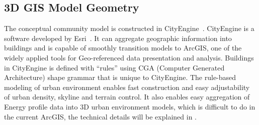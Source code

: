 \begin{comment}
\begin{figure}[h!]
  \centering
  \begin{subfigure}{0.4\textwidth}
  \centering
  \texttt{[image: original-Cooling:Electricity]}
  \caption[Electricity Cooling Demand]{Electricity Cooling Demand}
  \label{fig:original-Cooling:Electricity}
\end{subfigure}
~
\begin{subfigure}{0.4\textwidth}
  \centering
  \texttt{[image: log-Scale-Cooling:Electricity]}
  \caption[Electricity Cooling Demand]{Electricity Cooling Demand in Log Scale}
  \label{fig:log-Scale-Cooling:Electricity}
\end{subfigure}
  \caption[Electricity Cooling Demand Log]{Electricity Cooling Demand in Log Scale}
\end{figure}

\pagebreak
\item Electricity
\begin{figure}[h!]
  \centering
  \begin{subfigure}{0.4\textwidth}
  \centering
  \texttt{[image: original-Electricity:Facility]}
  \caption[Electricity  Demand]{Electricity Demand}
  \label{fig:original-Electricity:Facility}
\end{subfigure}
~
\begin{subfigure}{0.4\textwidth}
  \centering
  \texttt{[image: log-Scale-Electricity:Facility]}
  \caption[Electricity  Demand]{Electricity  Demand in Log Scale}
  \label{fig:log-Scale-Electricity:Facility}
\end{subfigure}
  \caption[Electricity  Demand Log]{Electricity Demand in Log Scale}
\end{figure}

\end{itemize}
\end{comment}

\pagebreak
\subsection{3D GIS Model Geometry}
The conceptual community model is constructed in
CityEngine~\cite{cityEngine2015}. CityEngine is a software developed
by Esri~\cite{Esri2015}. It can aggregate geographic information into
buildings and is capable of smoothly transition models to
ArcGIS\cite{ArcGIS2015}, one of the widely applied tools for
Geo-referenced data presentation and analysis. Buildings in CityEngine
is defined with ``rules'' using CGA (Computer Generated Architecture)
shape grammar that is unique to CityEngine. The rule-based modeling of
urban environment enables fast construction and easy adjustability of
urban density, skyline and terrain control. It also enables easy
aggregation of Energy profile data into 3D urban environment models,
which is difficult to do in the current ArcGIS, the technical details
will be explained in .

